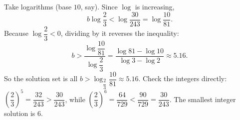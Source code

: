 Take logarithms (base $10$, say). Since $\log$ is increasing,
\[
b\log\dfrac{2}{3}<\log\dfrac{30}{243}=\log\dfrac{10}{81}.
\]
Because $\log\dfrac{2}{3}<0$, dividing by it reverses the inequality:
\[
b>\dfrac{\log\dfrac{10}{81}}{\log\dfrac{2}{3}}=\dfrac{\log81-\log10}{\log3-\log2}\approx5.16 .
\]
So the solution set is all $b>\log_{\dfrac{2}{3}}\dfrac{10}{81}\approx5.16$. Check the integers directly: $\left(\dfrac{2}{3}\right)^5=\dfrac{32}{243}>\dfrac{30}{243}$, while $\left(\dfrac{2}{3}\right)^6=\dfrac{64}{729}<\dfrac{90}{729}=\dfrac{30}{243}$. The smallest integer solution is $\boxed{6}$.
